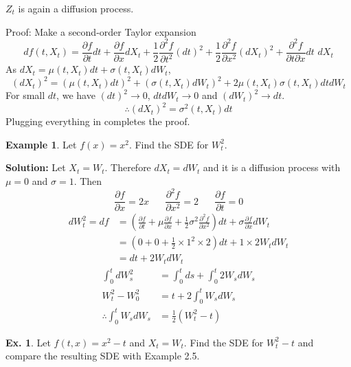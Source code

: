 \documentclass[11pt,a4paper]{book}
\theoremstyle{definition}\newtheorem{definition}{Definition}
\theoremstyle{definition}\newtheorem{fact}{Fact}
\theoremstyle{definition}\newtheorem{remark}{Remark}
\theoremstyle{definition}\newtheorem{ex}{Ex.}
\theoremstyle{definition}\newtheorem{project}{Project}
\theoremstyle{definition}\newtheorem{problem}{Problem}
\theoremstyle{definition}\newtheorem{example}{Example}
\numberwithin{theorem}{section}
\numberwithin{corollary}{chapter}
\numberwithin{assumption}{chapter}
\numberwithin{definition}{chapter}
\numberwithin{prop}{chapter}
\numberwithin{notation}{chapter}
\numberwithin{problem}{chapter}
\numberwithin{example}{chapter}
\numberwithin{fact}{chapter}
\numberwithin{ex}{chapter}
\begin{document}
$Z_t$ is again a diffusion process.

\vspace{15pt}
Proof: Make a second-order Taylor expansion
\begin{equation}
df(t,X_t) = \frac{\partial f}{\partial t}dt + \frac{\partial f}{\partial x}dX_t + \frac{1}{2} \frac{\partial^2 f}{\partial t^2} (dt)^2 + \frac{1}{2} \frac{\partial^2 f}{\partial x^2} (dX_t)^2 + \frac{\partial^2 f}{\partial t \partial x}dt\,\,dX_t 
\end{equation}
As $dX_t = \mu(t,X_t) dt + \sigma(t,X_t) dW_t$,
$$ (dX_t)^2 = (\mu(t,X_t) dt)^2 + (\sigma(t,X_t) dW_t)^2 + 2\mu(t,X_t)\sigma(t,X_t)dt dW_t $$
For small $dt$, we have $(dt)^2 \rightarrow 0$, $dt dW_t \rightarrow 0$ and $(dW_t)^2 \rightarrow dt$.
$$ \therefore (dX_t)^2 = \sigma^2(t,X_t)dt $$
Plugging everything in completes the proof.

\pagebreak

\begin{example}
Let $f(x) = x^2$. Find the SDE for $W_t^2$.

\vspace{15pt}
\textbf{Solution:}
Let $X_t = W_t$. Therefore $dX_t = dW_t$ and it is a diffusion process with $\mu = 0$ and $\sigma = 1$.
Then 
$$ \frac{\partial f}{\partial x} = 2x \,\,\,\,\,\,\,\,\,\, \frac{\partial^2 f}{\partial x^2} = 2 \,\,\,\,\,\,\,\,\,\,
\frac{\partial f}{\partial t} = 0 $$
\begin{align*}
dW_t^2 = df &= \left( \frac{\partial f}{\partial t} + \mu \frac{\partial f}{\partial x} + \frac{1}{2} \sigma^2 \frac{\partial^2 f}{\partial x^2} \right) dt + \sigma \frac{\partial f}{\partial x} dW_t \\
&= ( 0 + 0 + \frac{1}{2}\times 1^2 \times 2)dt + 1 \times 2 W_t dW_t \\
&= dt + 2W_t dW_t
\end{align*}
\begin{align*}
\int_0^t dW_s^2 &= \int_0^t ds + \int_0^t 2W_s dW_s \\
W_t^2 - W_0^2 &= t + 2\int_0^t W_s dW_s \\
\therefore \int_0^t W_s dW_s &= \frac{1}{2}(W_t^2 - t)
\end{align*}
\end{example}

\begin{ex}
Let $f(t,x) = x^2-t$ and $X_t = W_t$. Find the SDE for $W_t^2-t$ and compare the resulting SDE with Example 2.5.
\end{ex}
\end{document}
